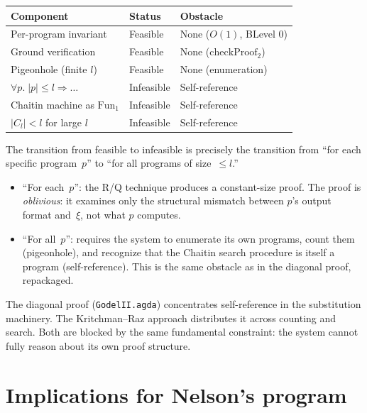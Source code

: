 \documentclass[11pt]{article}
\begin{document}
\begin{center}
\begin{tabular}{lll}
\textbf{Component} & \textbf{Status} & \textbf{Obstacle} \\
\hline
Per-program invariant & Feasible & None ($O(1)$, BLevel 0) \\
Ground verification & Feasible & None ($\mathrm{checkProof}_2$) \\
Pigeonhole (finite $l$) & Feasible & None (enumeration) \\
\hline
$\forall p.\; |p| \le l \Rightarrow \ldots$ & Infeasible & Self-reference \\
Chaitin machine as $\mathrm{Fun}_1$ & Infeasible & Self-reference \\
$|C_l| < l$ for large $l$ & Infeasible & Self-reference \\
\end{tabular}
\end{center}

The transition from feasible to infeasible is precisely the
transition from ``for each specific program~$p$'' to
``for all programs of size~$\le l$.''

\begin{itemize}[nosep]
\item ``For each~$p$'': the R/Q technique produces a constant-size
  proof.  The proof is \emph{oblivious}: it examines only the
  structural mismatch between $p$'s output format and~$\xi$,
  not what $p$ computes.

\item ``For all~$p$'': requires the system to enumerate its own
  programs, count them (pigeonhole), and recognize that the
  Chaitin search procedure is itself a program (self-reference).
  This is the same obstacle as in the diagonal proof, repackaged.
\end{itemize}

The diagonal proof (\texttt{GodelII.agda}) concentrates
self-reference in the substitution machinery.
The Kritchman--Raz approach distributes it across counting and search.
Both are blocked by the same fundamental constraint:
the system cannot fully reason about its own proof structure.

\section{Implications for Nelson's program}
\end{document}
